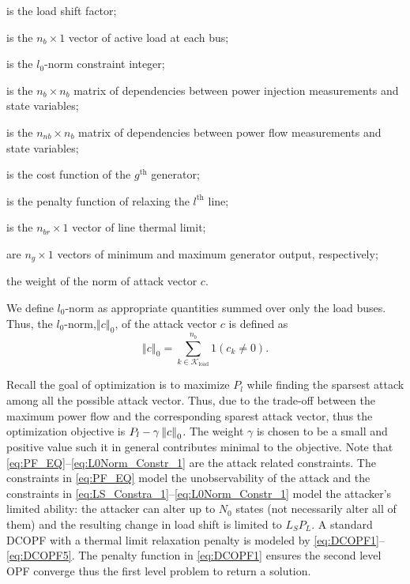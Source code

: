 \documentclass[twocolumn,english,final,journal]{IEEEtran}
\theoremstyle{plain}
\theoremstyle{definition}
\begin{document}
\begin{description}[leftmargin=1.8cm,style=multiline]
\item[$L_{S}$] is the load shift factor;
\item[$P_{L}$] is the $n_{b}\times1$ vector of active load at each bus;
\item[$N_{0}$] is the $l_{0}$-norm constraint integer;
\item[$H_{1}$] is the $n_{b}\times n_{b}$ matrix of dependencies between power injection
measurements and state variables;
\item[$H_{2}$] is the $n_{nb}\times n_{b}$ matrix of dependencies between power
flow measurements and state variables;
\item[$f_{g}$] is the cost function of the $g^{\mbox{th}}$ generator;
\item[$\mathcal{P}_{l}$]  is the penalty function of relaxing the $l^{\mbox{th}}$ line;
\item[$P^{\max}$] is the $n_{br}\times1$ vector of line thermal limit;
\item[$P_{G}^{\min},P_{G}^{\max}$] are $n_{g}\times1$ vectors of minimum and maximum generator output,
respectively;
\item[$\gamma$] the weight of the norm of attack vector $c$.
\end{description}

We define $l_{0}$-norm as appropriate quantities summed over
only the load buses. Thus, the $l_{0}$-norm,$\left\Vert c\right\Vert _{0}$,
of the attack vector $c$ is defined as
\begin{equation}
\left\Vert c\right\Vert _{0}=\sum_{k\in\mathcal{K}_{\textrm{load}}}^{n_{b}}1(c_{k}\neq0).\label{eq:N0_computation}
\end{equation}


Recall the goal of optimization is to maximize $P_{l}$ while finding
the sparsest attack among all the possible attack vector. Thus, due
to the trade-off between the maximum power flow and the corresponding
sparest attack vector, thus the optimization objective is $P_{l}-\mbox{\ensuremath{\gamma\left\Vert c\right\Vert _{0}}}$.
The weight $\gamma$ is chosen to be a small and positive value such
it in general contributes minimal to the objective. Note that \eqref{eq:PF_EQ}--\eqref{eq:L0Norm_Constr_1}
are the attack related constraints. The constraints in \eqref{eq:PF_EQ}
model the unobservability of the attack and the constraints in \eqref{eq:LS_Constra_1}--\eqref{eq:L0Norm_Constr_1}
model the attacker's limited ability: the attacker can alter up to
$N_{0}$ states (not necessarily alter all of them) and the resulting
change in load shift is limited to $L_{S}P_{L}$. A standard DCOPF
with a thermal limit relaxation penalty is modeled by \eqref{eq:DCOPF1}--\eqref{eq:DCOPF5}.
The penalty function in \eqref{eq:DCOPF1} ensures the second level
OPF converge thus the first level problem to return a solution.
\end{document}
